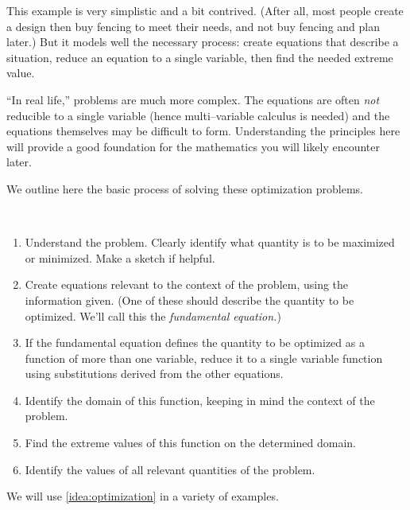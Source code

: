 This example is very simplistic and a bit contrived. (After all, most people create a design then buy fencing to meet their needs, and not buy fencing and plan later.) But it models well the necessary process: create equations that describe a situation, reduce an equation to a single variable, then find the needed extreme value.

``In real life,'' problems are much more complex. The equations are often \textit{not} reducible to a single variable (hence multi--variable calculus is needed) and the equations themselves may be difficult to form. Understanding the principles here will provide a good foundation for the mathematics you will likely encounter later.

We outline here the basic process of solving these optimization problems.
{}
{~\\[-\baselineskip]
\begin{enumerate}
	\item	Understand the problem. Clearly identify what quantity is to be maximized or minimized. Make a sketch if helpful.
	\item	Create equations relevant to the context of the problem, using the information given. (One of these should describe the quantity to be optimized. We'll call this the \textit{fundamental equation.})
	\item	If the fundamental equation defines the quantity to be optimized as a function of more than one variable, reduce it to a single variable function using substitutions derived from the other equations.
%
	\item	Identify the domain of this function, keeping in mind the context of the problem.
	\item	Find the extreme values of this function on the determined domain.
	\item	Identify the values of all relevant quantities of the problem.
\end{enumerate}}

We will use \autoref{idea:optimization} in a variety of examples.

